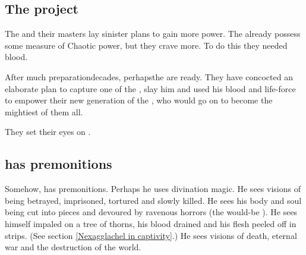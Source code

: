 








\subsection{The \Sathariah project}
The \resphain{} and their \bane{} masters lay sinister plans to gain more power. The \resphain{} already possess some measure of Chaotic power, but they crave more. To do this they needed \draconic{} blood. 

After much preparation\dash decades, perhaps\dash the \resphain{} are ready. They have concocted an elaborate plan to capture one of the \shaeeroths{}, slay him and used his blood and life-force to empower their new generation of \resphain\dash the , who would go on to become the mightiest of them all. 

They set their eyes on \Ishnaruchaefir.







\subsection{\Ishnaruchaefir has premonitions}
Somehow, \Ishnaruchaefir{} has premonitions. 
Perhaps he uses divination magic. 
He sees visions of being betrayed, imprisoned, tortured and slowly killed. 
He sees his body and soul being cut into pieces and devoured by ravenous horrors (the would-be \satharioth). 
He sees himself impaled on a tree of thorns, his blood drained and his flesh peeled off in strips. (See section \ref{Nexagglachel in captivity}.) 
He sees visions of death, eternal war and the destruction of the world. 

